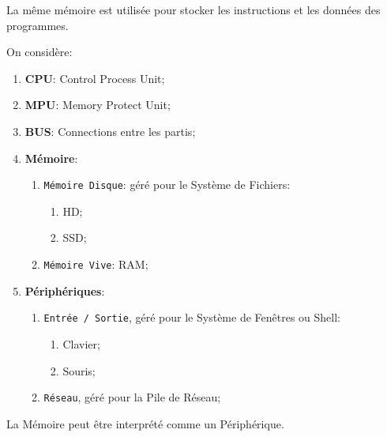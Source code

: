 \documentclass{article}
\begin{document}
\begin{definition}\label{def:architectureVonNeumann}
    La même mémoire est utilisée pour stocker les instructions et les données des programmes.

    \begin{figure}[H]
        \centering{}
    \end{figure}
    On considère:
    \begin{enumerate}
        \item \textbf{CPU}: Control Process Unit;
        \item \textbf{MPU}: Memory Protect Unit;
        \item \textbf{BUS}: Connections entre les partis;
        \item \textbf{Mémoire}:
        \begin{enumerate}[noitemsep]
            \item \texttt{Mémoire Disque}: géré pour le Système de Fichiers:
            \begin{enumerate}[noitemsep]
                \item HD;
                \item SSD;
            \end{enumerate}
            \item \texttt{Mémoire Vive}: RAM;
        \end{enumerate}
        \item \textbf{Périphériques}:
        \begin{enumerate}[noitemsep]
            \item \texttt{Entrée / Sortie}, géré pour le Système de Fenêtres ou Shell:
            \begin{enumerate}[noitemsep]
                \item Clavier;
                \item Souris; 
            \end{enumerate}
            \item \texttt{Réseau}, géré pour la Pile de Réseau;
        \end{enumerate}
    \end{enumerate}

    \begin{remark}
        La Mémoire peut être interprété comme un Périphérique.
    \end{remark}
\end{definition}
\end{document}
